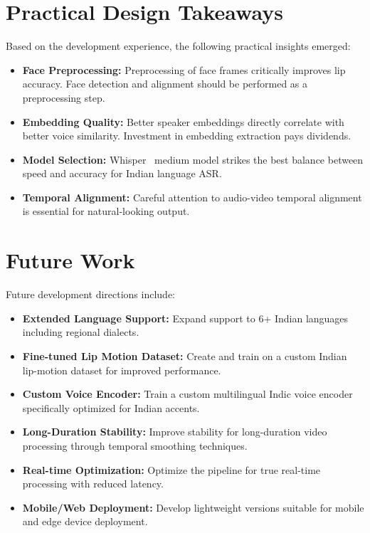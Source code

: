 \documentclass[12pt,oneside]{report}
\begin{document}
\section{Practical Design Takeaways}

Based on the development experience, the following practical insights emerged:
\begin{itemize}
    \item \textbf{Face Preprocessing:} Preprocessing of face frames critically improves lip accuracy. Face detection and alignment should be performed as a preprocessing step.
    
    \item \textbf{Embedding Quality:} Better speaker embeddings directly correlate with better voice similarity. Investment in embedding extraction pays dividends.
    
    \item \textbf{Model Selection:} Whisper~\cite{radford2023whisper} medium model strikes the best balance between speed and accuracy for Indian language ASR.
    
    \item \textbf{Temporal Alignment:} Careful attention to audio-video temporal alignment is essential for natural-looking output.
\end{itemize}

\section{Future Work}

Future development directions include:

\begin{itemize}
    \item \textbf{Extended Language Support:} Expand support to 6+ Indian languages including regional dialects.
    
    \item \textbf{Fine-tuned Lip Motion Dataset:} Create and train on a custom Indian lip-motion dataset for improved performance.
    
    \item \textbf{Custom Voice Encoder:} Train a custom multilingual Indic voice encoder specifically optimized for Indian accents.
    
    \item \textbf{Long-Duration Stability:} Improve stability for long-duration video processing through temporal smoothing techniques.
    
    \item \textbf{Real-time Optimization:} Optimize the pipeline for true real-time processing with reduced latency.
    
    \item \textbf{Mobile/Web Deployment:} Develop lightweight versions suitable for mobile and edge device deployment.
\end{itemize}
\end{document}

